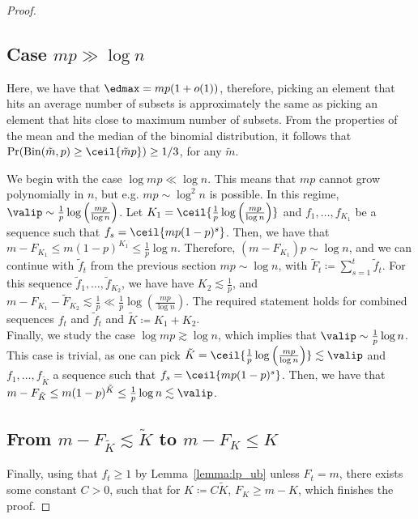 \begin{proof}
\subsection*{Case \(mp \gg \log n\)}
Here, we have that \(\edmax = mp (1 + o(1))\), therefore, picking an element that hits an average number of subsets is approximately the same as picking an element that hits close to maximum number of subsets. From the properties of the mean and the median of the binomial distribution, it follows that \(\Pr(\mathrm{Bin}(\tilde m, p) \geq \ceil{\tilde m p}) \geq 1/3\), for any \(\tilde m\). 

We begin with the case \(\log mp \ll \log n\). This means that \(mp\) cannot grow polynomially in \(n\), but e.g. \(mp \sim \log^2 n\) is possible. In this regime, \(\valip \sim \frac{1}{p} \log \left(\frac{mp}{\log n}\right)\). Let \(K_1 = \ceil{\frac{1}{p} \log \left(\frac{mp}{\log n}\right)}\) and \(f_1, \ldots, f_{K_1}\) be a sequence such that \(f_{s} = \ceil{mp(1-p)^s}\). Then, we have that \(m - F_{K_1} \leq m(1 - p)^{K_1} \leq \frac{1}{p}\log n\). Therefore, \((m - F_{K_1})p \sim \log n\), and we can continue with \(\tilde{f}_t\) from the previous section \(mp \sim \log n\), with \(\tilde{F}_t \coloneqq \sum_{s=1}^t \tilde{f}_t\). For this sequence \(\tilde{f}_1, \ldots, \tilde{f}_{K_2}\), we have have \(K_2 \lesssim \frac{1}{p}\), and \(m - F_{K_1} - \tilde{F}_{K_2} \lesssim \frac{1}{p} \ll \frac{1}{p} \log \left(\frac{mp}{\log n}\right)\). The required statement holds for combined sequences \(f_t\) and \(\tilde{f}_t\) and \(\tilde K \coloneqq K_1 + K_2\). \\
\noindent
Finally, we study the case \(\log mp \gtrsim \log n\), which implies that \(\valip \sim \frac{1}{p} \log n\). This case is trivial, as one can pick \(\tilde K = \ceil{\frac{1}{p} \log \left(\frac{mp}{\log n}\right)} \lesssim \valip\) and \(f_1, \ldots, f_{\tilde K}\) a sequence such that \(f_{s} = \ceil{mp(1-p)^s}\). Then, we have that \(m - F_{\tilde K} \leq m(1 - p)^{\tilde K} \leq \frac{1}{p}\log n \lesssim \valip\). 

\subsection*{From \(m - F_{\tilde K} \lesssim \tilde K\) to \(m - F_K \leq K\)}
Finally, using that \(f_t \geq 1\) by Lemma~\ref{lemma:lp_ub} unless \(F_t = m\), there exists some constant \(C > 0\), such that for \(K \coloneqq C\tilde K\), \(F_K \geq m - K\), which finishes the proof.
\end{proof}

